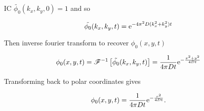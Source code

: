 IC $ \tilde{\phi_0}(k_x,k_y,0) = 1$ and so

\begin{equation}
  \tilde{\phi_0}(k_x,k_y,t) = \mathrm{e}^{-4\pi^2D(k_x^2 + k_y^2)t} \\
\end{equation}

Then inverse fourier transform to recover $\phi_0(x,y,t)$

\begin{equation}
  \phi_0(x,y,t) = \mathscr{F}^{-1}\left[\tilde{\phi_0}(k_x,k_y,t)\right] = \frac{1}{4\pi Dt}\mathrm{e}^{-\frac{x^2 + y^2}{4Dt}} \\
\end{equation}

Transforming back to polar coordinates gives

\begin{equation}
  \phi_0(x,y,t) = \frac{1}{4\pi Dt}\mathrm{e}^{-\frac{r^2}{4Dt}} .\\
  \label{eqn:phi_0}
\end{equation}
